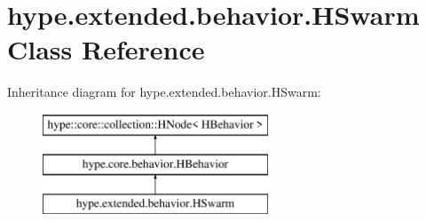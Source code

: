 \hypertarget{classhype_1_1extended_1_1behavior_1_1_h_swarm}{\section{hype.\-extended.\-behavior.\-H\-Swarm Class Reference}
\label{classhype_1_1extended_1_1behavior_1_1_h_swarm}
}
Inheritance diagram for hype.\-extended.\-behavior.\-H\-Swarm\-:\begin{figure}[H]
\begin{center}
\leavevmode
\includegraphics[height=3.000000cm]{classhype_1_1extended_1_1behavior_1_1_h_swarm}
\end{center}
\end{figure}
